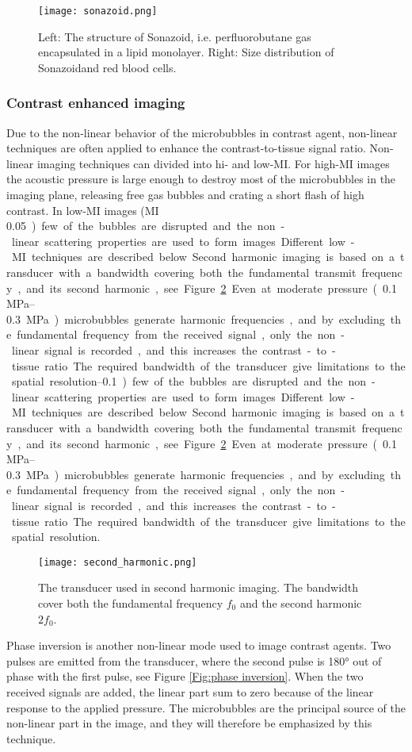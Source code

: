 \begin{figure}[h]
  \centering
  \label{Fig:Sonazoid}
  \texttt{[image: sonazoid.png]}
  \caption{Left: The structure of Sonazoid\texttrademark , i.e. perfluorobutane gas encapsulated in a lipid monolayer. Right: Size distribution of Sonazoid\texttrademark and red blood cells\cite{Healey2012}.}
\end{figure}

\subsubsection{Contrast enhanced imaging}
\label{sec:contrast img}
Due to the non-linear behavior of the microbubbles in contrast agent, non-linear techniques are often applied to enhance the contrast-to-tissue signal ratio. Non-linear imaging techniques can divided into hi- and low-MI.  For high-MI images the acoustic pressure is large enough to destroy most of the microbubbles in the imaging plane, releasing free gas bubbles and crating a short flash of high contrast. In low-MI images (MI \SIrange{0.05}{0.1}) few of the bubbles are disrupted and the non-linear scattering properties are used to form images. Different low-MI techniques are described below.

Second harmonic imaging is based on a transducer with a bandwidth covering both the fundamental transmit frequency, and its second harmonic, see Figure \ref{Fig:Second harmonic}. Even at moderate pressure (\SIrange{0.1}{0.3}{\mega\pascal}) microbubbles generate harmonic frequencies, and by excluding the fundamental frequency from the received signal, only the non-linear signal is recorded, and this increases the contrast-to-tissue ratio. The required bandwidth of the transducer give limitations to the spatial resolution. 


\begin{figure}[h]
  \centering
  \label{Fig:Second harmonic}
  \texttt{[image: second\_harmonic.png]}
  \caption{The transducer used in second harmonic imaging. The bandwidth cover both the fundamental frequency $f_0$ and the second harmonic $2f_0$\cite{Hoskins2010}.}
\end{figure}
 
Phase inversion is another non-linear mode used to image contrast agents. Two pulses are emitted from the transducer, where the second pulse is \ang{180} out of phase with the first pulse, see Figure \ref{Fig:phase inversion}. When the two received signals are added, the linear part sum to zero because of the linear response to the applied pressure. The microbubbles are the principal source of the non-linear part in the image, and they will therefore be emphasized by this technique.

